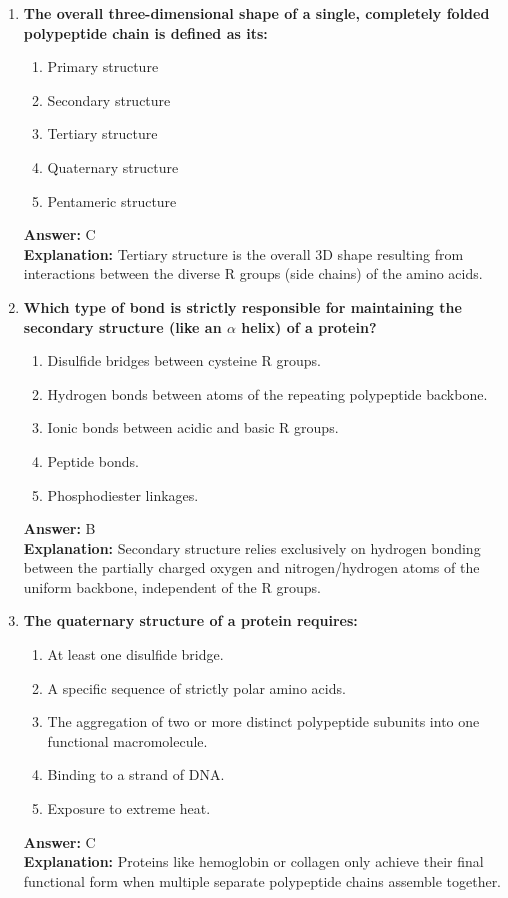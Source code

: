 \documentclass[11pt, a4paper]{article}
\begin{document}
\begin{enumerate}
\item \textbf{The overall three-dimensional shape of a single, completely folded polypeptide chain is defined as its:}
\begin{enumerate}[label=\Alph*.]
    \item Primary structure
    \item Secondary structure
    \item Tertiary structure
    \item Quaternary structure
    \item Pentameric structure
\end{enumerate}
\textbf{Answer:} C \\
\textbf{Explanation:} Tertiary structure is the overall 3D shape resulting from interactions between the diverse R groups (side chains) of the amino acids.

\item \textbf{Which type of bond is strictly responsible for maintaining the secondary structure (like an $\alpha$ helix) of a protein?}
\begin{enumerate}[label=\Alph*.]
    \item Disulfide bridges between cysteine R groups.
    \item Hydrogen bonds between atoms of the repeating polypeptide backbone.
    \item Ionic bonds between acidic and basic R groups.
    \item Peptide bonds.
    \item Phosphodiester linkages.
\end{enumerate}
\textbf{Answer:} B \\
\textbf{Explanation:} Secondary structure relies exclusively on hydrogen bonding between the partially charged oxygen and nitrogen/hydrogen atoms of the uniform backbone, independent of the R groups.

\item \textbf{The quaternary structure of a protein requires:}
\begin{enumerate}[label=\Alph*.]
    \item At least one disulfide bridge.
    \item A specific sequence of strictly polar amino acids.
    \item The aggregation of two or more distinct polypeptide subunits into one functional macromolecule.
    \item Binding to a strand of DNA.
    \item Exposure to extreme heat.
\end{enumerate}
\textbf{Answer:} C \\
\textbf{Explanation:} Proteins like hemoglobin or collagen only achieve their final functional form when multiple separate polypeptide chains assemble together.


\end{enumerate}
\end{document}
